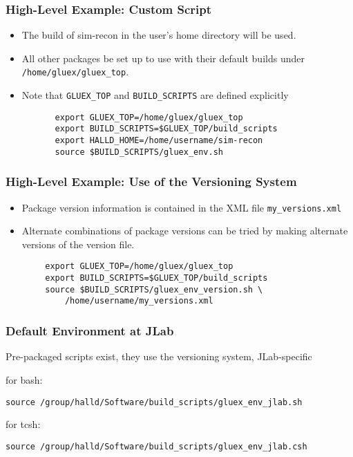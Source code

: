 \documentclass{beamer}
\newcommand{\bi}{\begin{itemize}}
\newcommand{\ei}{\end{itemize}}
\newcommand{\I}{\item}
\begin{document}
\begin{frame}[fragile]
  \frametitle{High-Level Example: Custom Script}
\bi
\I The build of sim-recon in the user's home directory will be used.
\I All other packages be set up to use with their default builds under {\tt
    /home/gluex/gluex\_top}.
\I Note that {\tt GLUEX\_TOP} and {\tt BUILD\_SCRIPTS} are defined explicitly
\ei
\begin{verbatim}
          export GLUEX_TOP=/home/gluex/gluex_top
          export BUILD_SCRIPTS=$GLUEX_TOP/build_scripts
          export HALLD_HOME=/home/username/sim-recon
          source $BUILD_SCRIPTS/gluex_env.sh
\end{verbatim}

\end{frame}
\begin{frame}[fragile]
  \frametitle{High-Level Example: Use of the Versioning System}
\bi
\I Package version information is contained in the XML file {\tt my\_versions.xml}
\I Alternate combinations of package versions can be tried by making alternate versions of the version file.
\ei
\begin{verbatim}
        export GLUEX_TOP=/home/gluex/gluex_top
        export BUILD_SCRIPTS=$GLUEX_TOP/build_scripts
        source $BUILD_SCRIPTS/gluex_env_version.sh \
            /home/username/my_versions.xml
\end{verbatim}

\end{frame}
\begin{frame}[fragile]
  \frametitle{Default Environment at JLab}
Pre-packaged scripts exist, they use the versioning system, JLab-specific

for bash:
\begin{verbatim}
source /group/halld/Software/build_scripts/gluex_env_jlab.sh
\end{verbatim}
for tcsh:
\begin{verbatim}
source /group/halld/Software/build_scripts/gluex_env_jlab.csh
\end{verbatim}

\end{frame}
\end{document}
